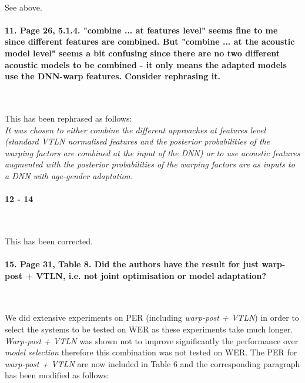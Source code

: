 \documentclass[]{article}
\begin{document}
~

See above.

\paragraph{11. Page 26, 5.1.4. "combine ... at features level" seems fine to me since different features are combined. But "combine ... at the acoustic model level" seems a bit confusing since there are no two different acoustic models to be combined - it only means the adapted models use the DNN-warp features. Consider rephrasing it.}

~

This has been rephrased as follows:\\
\textit{It was chosen to either combine the different approaches at features level (standard VTLN normalised features and the posterior probabilities of the warping factors are combined at the input of the DNN) or to use acoustic features augmented with the posterior probabilities of the warping factors are as inputs to a DNN with age-gender adaptation.}

\paragraph{12 - 14}

~

This has been corrected.

\paragraph{15. Page 31, Table 8. Did the authors have the result for just warp-post + VTLN, i.e. not joint optimisation or model adaptation?}

~

We did extensive experiments on PER (including \textit{warp-post + VTLN}) in order to select the systems to be tested on WER as these experiments take much longer. \textit{Warp-post + VTLN} was shown not to improve significantly the performance over \textit{model selection} therefore this combination was not tested on WER. The PER for \textit{warp-post + VTLN} are now included in Table 6 and the corresponding paragraph has been modified as follows:
\end{document}
